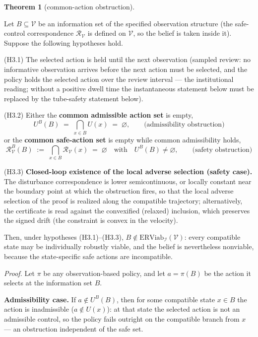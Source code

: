 \documentclass[11pt]{article}
\theoremstyle{definition}
\newtheorem{theorem}{Theorem}
\begin{document}
\begin{theorem}[common-action obstruction]\label{thm:common-action}

Let \(B \subseteq \mathcal{V}\) be an information set of the specified observation structure (the safe-control correspondence
\(\mathcal{R}_{\mathcal{V}}\) is defined on \(\mathcal{V}\), so the
belief is taken inside it). Suppose the following hypotheses hold.

(H3.1) The selected action is held until the next observation (sampled
review: no informative observation arrives before the next action must
be selected, and the policy holds the selected action over the review
interval --- the institutional reading; without a positive dwell time
the instantaneous statement below must be replaced by the tube-safety statement below).

(H3.2) Either the \textbf{common admissible action set} is empty,
\[U^B(B) \;=\; \bigcap_{x \in B} U(x) \;=\; \varnothing, \qquad \text{(admissibility obstruction)}\]
or the \textbf{common safe-action set} is empty while common
admissibility holds,
\[\mathcal{R}_{\mathcal{V}}^B(B) \;:=\; \bigcap_{x \in B} \mathcal{R}_{\mathcal{V}}(x) \;=\; \varnothing \quad \text{with} \quad U^B(B) \neq \varnothing, \tag{2} \qquad \text{(safety obstruction)}\]

(H3.3) \textbf{Closed-loop existence of the local adverse selection
(safety case).} The disturbance correspondence is lower semicontinuous,
or locally constant near the boundary point at which the obstruction
fires, so that the local adverse selection of the proof is realized
along the compatible trajectory; alternatively, the certificate is read
against the convexified (relaxed) inclusion, which preserves the
signed drift (the constraint is convex in the velocity).

Then, under hypotheses (H3.1)--(H3.3),
\(B \notin \mathrm{ERViab}_{\mathcal{I}}(\mathcal{V})\): every
compatible state may be individually robustly viable, and the belief is
nevertheless nonviable, because the state-specific safe actions are
incompatible.

\end{theorem}

\emph{Proof.} Let \(\pi\) be any observation-based policy, and let
\(a = \pi(B)\) be the action it selects at the information set \(B\).

\textbf{Admissibility case.} If \(a \notin U^B(B)\), then for some
compatible state \(x \in B\) the action is inadmissible
(\(a \notin U(x)\)): at that state the selected action is not an
admissible control, so the policy fails outright on the compatible
branch from \(x\) --- an obstruction independent of the safe set.
\end{document}
